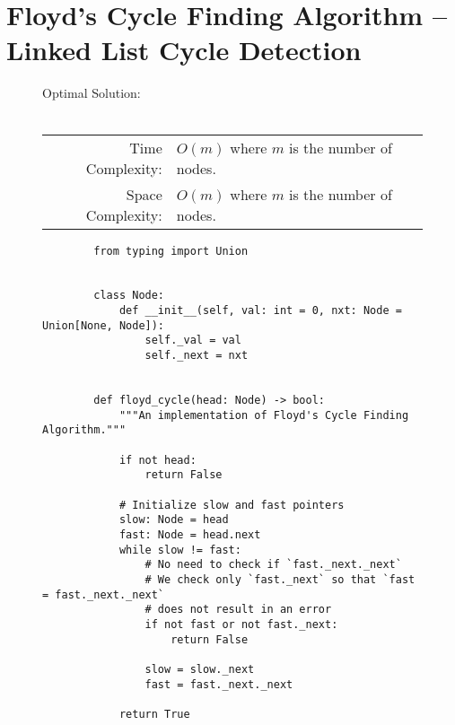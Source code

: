 
\section{Floyd's Cycle Finding Algorithm -- Linked List Cycle Detection}

\begin{figure}[H]
    Optimal Solution:\\\\
    \begin{tabular}{rl}
        Time Complexity:& \(O(m)\) where \(m\) is the number of nodes.\\
        Space Complexity:& \(O(m)\) where \(m\) is the number of nodes.
    \end{tabular}
\end{figure}

\begin{figure}[H]
    \centering
    \begin{verbatim}
        from typing import Union


        class Node:
            def __init__(self, val: int = 0, nxt: Node = Union[None, Node]):
                self._val = val
                self._next = nxt


        def floyd_cycle(head: Node) -> bool:
            """An implementation of Floyd's Cycle Finding Algorithm."""

            if not head:
                return False

            # Initialize slow and fast pointers
            slow: Node = head
            fast: Node = head.next
            while slow != fast:
                # No need to check if `fast._next._next`
                # We check only `fast._next` so that `fast = fast._next._next`
                # does not result in an error
                if not fast or not fast._next:
                    return False

                slow = slow._next
                fast = fast._next._next

            return True
    \end{verbatim}
\end{figure}
